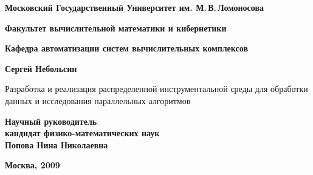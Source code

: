 \begin{titlepage}
  \begin{center}
    {\bfseries {Московский Государственный Университет им. М.\,В.\,Ломоносова} \par}
    {\bfseries {Факультет вычислительной математики и кибернетики} \par}
    {\bfseries {Кафедра автоматизации систем вычислительных комплексов} \par}
  \end{center}
  
  \vspace{5cm}

  \begin{center}
    \bfseries
    \bigskip \medskip
    Сергей Небольсин \par			
    \bigskip \medskip
    Разработка и реализация распределенной инструментальной среды для обработки данных и исследования параллельных алгоритмов \par
  \end{center}

  \vspace{2cm}
  \begin{flushright}
    \bfseries
    Научный руководитель \\
    кандидат физико-математических наук \\
    Попова Нина Николаевна
  \end{flushright}

  \begin{center}
    \vspace*{\fill}
    \bfseries Москва, 2009 \par
  \end{center}
\end{titlepage}
